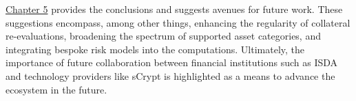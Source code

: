 \hyperref[ch:conclusions]{Chapter 5} provides the conclusions and suggests avenues for future work. These suggestions encompass, among other things, enhancing the regularity of collateral re-evaluations, broadening the spectrum of supported asset categories, and integrating bespoke risk models into the computations. Ultimately, the importance of future collaboration between financial institutions such as ISDA and technology providers like sCrypt is highlighted as a means to advance the ecosystem in the future.